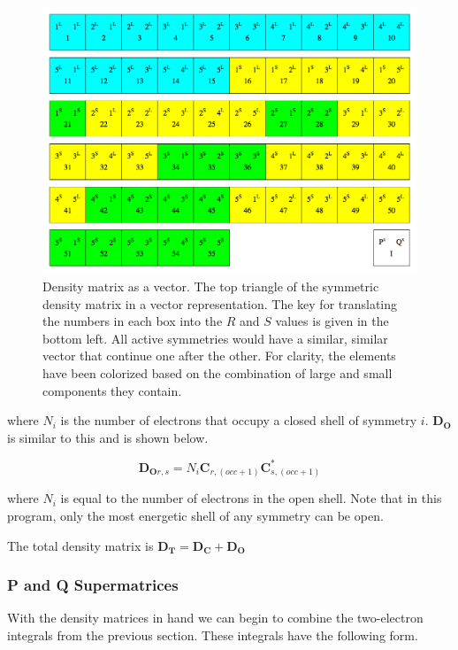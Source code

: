 \begin{figure}
\includegraphics[width=1\textwidth]{Figures/dtmx_vec.png}
\caption[Density matrix as a vector]
{Density matrix as a vector. The top triangle of the symmetric density matrix in a vector representation. The key for translating the numbers in each box into the $R$ and $S$ values is given in the bottom left. All active symmetries would have a similar, similar vector that continue one after the other. For clarity, the elements have been colorized based on the combination of large and small components they contain.}
\label{fig:dtmxvec}
\end{figure}


where $N_{i}$ is the number of electrons that occupy a closed shell of symmetry $i$. \textbf{D$_\textbf{O}$} is similar to this and is shown below.

\begin{equation}
\label{RDOMX}
\textbf{D$_{\textbf{O}r,s}$} =N_{i}\textbf{C}_{r,(occ+1)}\textbf{C}^{*}_{s,(occ+1)}
\end{equation}

where $N_{i}$ is equal to the number of electrons in the open shell. Note that in this program, only the most energetic shell of any symmetry can be open.

The total density matrix is $\textbf{D$_{\textbf{T}}$} =  \textbf{D$_{\textbf{C}}$} + \textbf{D$_{\textbf{O}}$}$

\subsubsection{P and Q Supermatrices}
\label{sec:PQmeth}
With the density matrices in hand we can begin to combine the two-electron integrals from the previous section. These integrals have the following form.\cite{MATSUOKA2001218}

